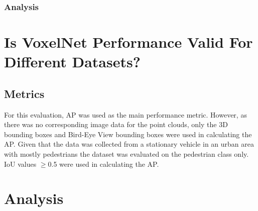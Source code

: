 \subsubsection{Analysis}


\section{Is VoxelNet Performance Valid For Different Datasets?}
\subsection*{Metrics}
For this evaluation, AP was used as the main performance metric. However, as there was no corresponding image data for the point clouds, only the 3D bounding boxes and Bird-Eye View bounding boxes were used in calculating the AP. 
Given that the data was collected from a stationary vehicle in an urban area with mostly pedestrians the dataset was evaluated on the pedestrian class only. IoU values $\geq$0.5 were used in calculating the AP. 
\section{Analysis}

